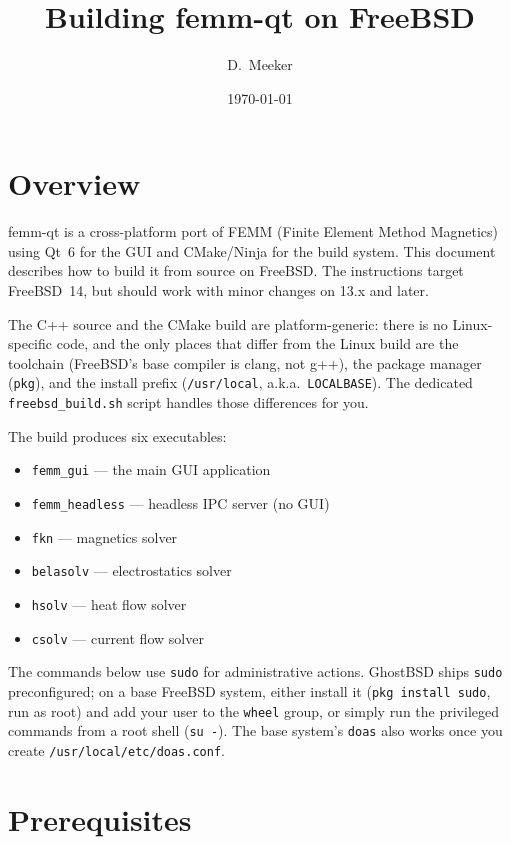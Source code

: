 \documentclass[11pt]{article}
\title{Building femm-qt on FreeBSD}
\author{D.\ Meeker}
\date{\today}
\begin{document}
\maketitle

\section{Overview}

femm-qt is a cross-platform port of FEMM (Finite Element Method Magnetics)
using Qt~6 for the GUI and CMake/Ninja for the build system.  This document
describes how to build it from source on FreeBSD.  The instructions target
FreeBSD~14, but should work with minor changes on 13.x and later.

The C++ source and the CMake build are platform-generic: there is no
Linux-specific code, and the only places that differ from the Linux build are
the toolchain (FreeBSD's base compiler is clang, not g++), the package manager
(\texttt{pkg}), and the install prefix (\texttt{/usr/local}, a.k.a.\
\texttt{LOCALBASE}).  The dedicated \texttt{freebsd\_build.sh} script handles
those differences for you.

The build produces six executables:
\begin{itemize}[nosep]
  \item \texttt{femm\_gui} --- the main GUI application
  \item \texttt{femm\_headless} --- headless IPC server (no GUI)
  \item \texttt{fkn} --- magnetics solver
  \item \texttt{belasolv} --- electrostatics solver
  \item \texttt{hsolv} --- heat flow solver
  \item \texttt{csolv} --- current flow solver
\end{itemize}

The commands below use \texttt{sudo} for administrative actions.  GhostBSD
ships \texttt{sudo} preconfigured; on a base FreeBSD system, either install it
(\texttt{pkg install sudo}, run as root) and add your user to the
\texttt{wheel} group, or simply run the privileged commands from a root shell
(\texttt{su -}).  The base system's \texttt{doas} also works once you create
\texttt{/usr/local/etc/doas.conf}.

\section{Prerequisites}
\end{document}
